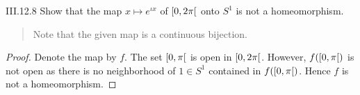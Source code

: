 \begin{problem}{III.12.8}
Show that the map \( x \mapsto e^{\iota x} \) of \( \left\lbrack{0, 2\pi}\right\lbrack \) onto \( S^{1} \) is not a homeomorphism.
\end{problem}

\begin{quote}
	Note that the given map is a continuous bijection.
\end{quote}

\begin{proof}
	Denote the map by \( f \). The set \( \left\lbrack{0, \pi}\right\lbrack \) is open in \( \left\lbrack{0, 2\pi}\right\lbrack \). However, \( f(\left\lbrack{0, \pi}\right\lbrack) \) is not open as there is no neighborhood of \( 1 \in S^{1} \) contained in \( f(\left\lbrack{0, \pi}\right\lbrack) \). Hence \( f \) is not a homeomorphism.
\end{proof}
